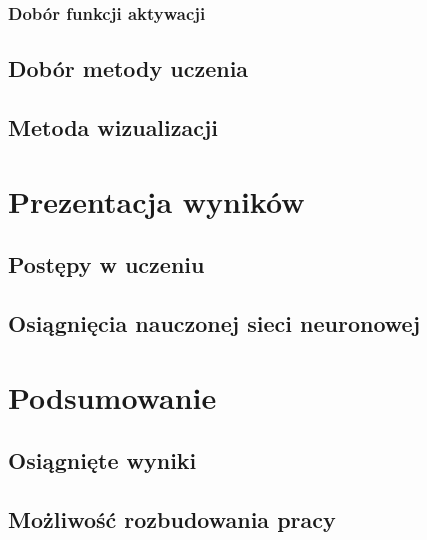         \subsection{Dobór funkcji aktywacji}
    \section{Dobór metody uczenia}
    \section{Metoda wizualizacji}
\chapter{Prezentacja wyników}
    \section{Postępy w uczeniu}
    \section{Osiągnięcia nauczonej sieci neuronowej}
\chapter{Podsumowanie}
    \section{Osiągnięte wyniki}
    \section{Możliwość rozbudowania pracy}
